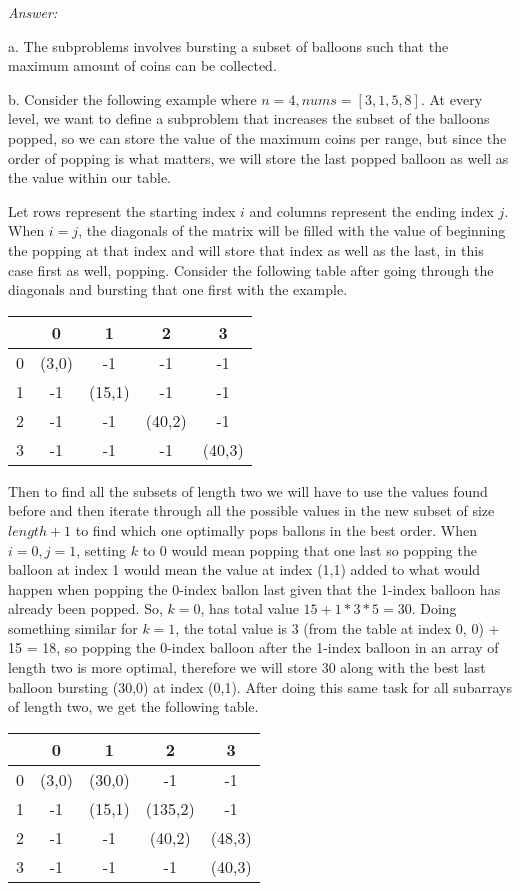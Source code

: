 \documentclass[12pt]{article}
\begin{document}
\textit{Answer: }

a. The subproblems involves bursting a subset of balloons such that the maximum amount of coins can be collected.

b. Consider the following example where $n=4, nums=[3,1,5,8]$. At every level, we want to define a subproblem that increases the subset of the balloons popped, so we can store the value of the maximum coins per range, but since the order of popping is what matters, we will store the last popped balloon as well as the value within our table.

Let rows represent the starting index $i$ and columns represent the ending index $j$. When $i=j$, the diagonals of the matrix will be filled with the value of beginning the popping at that index and will store that index as well as the last, in this case first as well, popping. Consider the following table after going through the diagonals and bursting that one first with the example.
\begin{center}
    \begin{tabular}{ |c|c|c|c|c| } 
      \hline
         & 0 & 1 & 2 & 3 \\ 
      \hline
      0 & (3,0) & -1 & -1& -1\\ 
      \hline
      1 & -1 & (15,1) & -1 & -1\\ 
      \hline
      2 & -1 & -1 & (40,2) & -1\\ 
      \hline
      3 & -1 & -1 & -1 & (40,3)\\ 
      \hline
    \end{tabular}
\end{center}
Then to find all the subsets of length two we will have to use the values found before and then iterate through all the possible values in the new subset of size $length+1$ to find which one optimally pops ballons in the best order. When $i=0,j=1$, setting $k$ to 0 would mean popping that one last so popping the balloon at index 1 would mean the value at index (1,1) added to what would happen when popping the 0-index ballon last given that the 1-index balloon has already been popped. So, $k=0$, has total value $15+1*3*5 = 30$. Doing something similar for $k=1$, the total value is 3 (from the table at index 0, 0) + 15 = 18, so popping the 0-index balloon after the 1-index balloon in an array of length two is more optimal, therefore we will store 30 along with the best last balloon bursting (30,0) at index (0,1). After doing this same task for all subarrays of length two, we get the following table.
\begin{center}
    \begin{tabular}{ |c|c|c|c|c| } 
      \hline
         & 0 & 1 & 2 & 3 \\ 
      \hline
      0 & (3,0) & (30,0) & -1& -1\\ 
      \hline
      1 & -1 & (15,1) & (135,2) & -1\\ 
      \hline
      2 & -1 & -1 & (40,2) & (48,3)\\ 
      \hline
      3 & -1 & -1 & -1 & (40,3)\\ 
      \hline
    \end{tabular}
\end{center}
\end{document}
